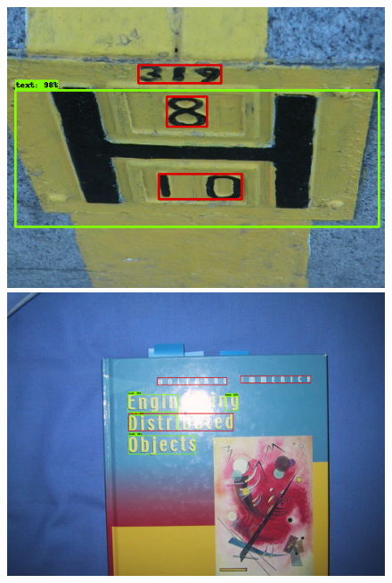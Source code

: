 \begin{figure}[!h]
	\centering
    
    \includegraphics[height=0.20\textheight]{VISAPP/figs/qualitative-results/icdar13/1m_crop.png}
    \includegraphics[height=0.20\textheight]{VISAPP/figs/qualitative-results/icdar13/18m.png}

    \vspace{1.5mm}


\end{figure}
